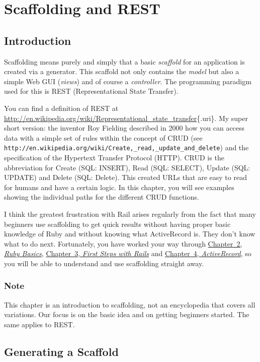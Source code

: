 \documentclass[a4paper]{book}
\newcommand{\chap}[1]{\newpage\thispagestyle{empty}\chapter{#1}\label{chap:\thechapter}}
\begin{document}
\chap{Scaffolding and REST}\label{scaffolding-and-rest}

\section{Introduction}\label{introduction-1}

Scaffolding means purely and simply that a basic \emph{scaffold} for an application is created via a generator. This scaffold not only contains the \emph{model} but also a simple Web GUI (\emph{views}) and of course a \emph{controller}. The programming paradigm used for this is REST (Representational State Transfer).

You can find a definition of REST at \url{http://en.wikipedia.org/wiki/Representational_state_transfer}\{.uri\}. My super short version: the inventor Roy Fielding described in 2000 how you can access data with a simple set of rules within the concept of CRUD (see \texttt{http://en.wikipedia.org/wiki/Create,\_read,\_update\_and\_delete}) and the specification of the Hypertext Transfer Protocol (HTTP). CRUD is the abbreviation for Create (SQL: INSERT), Read (SQL: SELECT), Update (SQL: UPDATE) and Delete (SQL: Delete). This created URLs that are easy to read for humans and have a certain logic. In this chapter, you will see examples showing the individual paths for the different CRUD functions.

I think the greatest frustration with Rail arises regularly from the fact that many beginners use scaffolding to get quick results without having proper basic knowledge of Ruby and without knowing what ActiveRecord is. They don't know what to do next. Fortunately, you have worked your way through \hyperref[ruby-grundlagen]{Chapter~2, \emph{Ruby Basics}}, \hyperref[ersteux5fschritteux5fmitux5frails]{Chapter~3, \emph{First Steps with Rails}} and \hyperref[activerecordux5fchapter]{Chapter~4, \emph{ActiveRecord}}, so you will be able to understand and use scaffolding straight away.

\subsection{Note}\label{note-32}

This chapter is an introduction to scaffolding, not an encyclopedia that covers all variations. Our focus is on the basic idea and on getting beginners started. The same applies to REST.

\section{Generating a Scaffold}\label{generating-a-scaffold}
\end{document}
